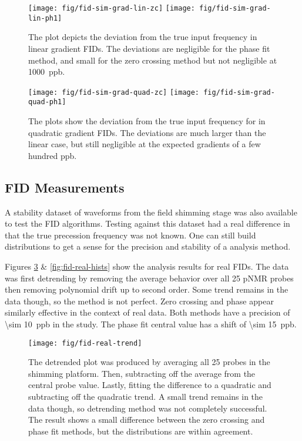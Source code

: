 \begin{figure}
\centering
\texttt{[image: fig/fid-sim-grad-lin-zc]}
\texttt{[image: fig/fid-sim-grad-lin-ph1]}
\caption{
    The plot depicts the deviation from the true input frequency in linear gradient FIDs.  The deviations are negligible for the phase fit method, and small for the zero crossing method but not negligible at \SI{1000}{ppb}.
    \label{fig:fid-sim-grad-lin-results}
} 
\end{figure}

\begin{figure}
\centering
\texttt{[image: fig/fid-sim-grad-quad-zc]}
\texttt{[image: fig/fid-sim-grad-quad-ph1]}
\caption{
    The plots show the deviation from the true input frequency for in quadratic gradient FIDs.  The deviations are much larger than the linear case, but still negligible at the expected gradients of a few hundred ppb.
    \label{fig:fid-sim-grad-quad-results}
}
\end{figure}

\subsection{FID Measurements}
A stability dataset of waveforms from the field shimming stage was also available to test the FID algorithms.  Testing against this dataset had a real difference in that the true precession frequency was not known.  One can still build distributions to get a sense for the precision and stability of a analysis method.

Figures \ref{fig:fid-real-trend} \& \ref{fig:fid-real-hists} show the analysis results for real FIDs.  The data was first detrending by removing the average behavior over all 25 pNMR probes then removing polynomial drift up to second order.  Some trend remains in the data though, so the method is not perfect. Zero crossing and phase appear similarly effective in the context of real data.  Both methods have a precision of \SI{\sim 10}{ppb} in the study.  The phase fit central value has a shift of \SI{\sim 15}{ppb}.

\begin{figure}
\centering
\texttt{[image: fig/fid-real-trend]}
\caption{
    The detrended plot was produced by averaging all 25 probes in the shimming platform.  Then, subtracting off the average from the central probe value.  Lastly, fitting the difference to a quadratic and subtracting off the quadratic trend.  A small trend remains in the data though, so detrending method was not completely successful.  The result shows a small difference between the zero crossing and phase fit methods, but the distributions are within agreement.
    \label{fig:fid-real-trend}
}
\end{figure}

